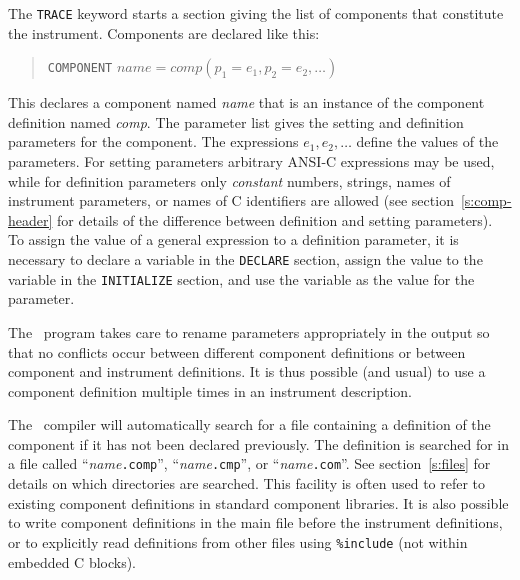 The \texttt{TRACE} keyword starts a section giving the list of
components that constitute the instrument.
Components are declared like this:
\begin{quote}
  \texttt{COMPONENT} $\textit{name} =
    \textit{comp}(p_1 = e_1, p_2 = e_2, \ldots)$
\end{quote}
 
This declares a component named \textit{name} that is an instance of the
component definition named \textit{comp}. The parameter list gives the
setting and definition parameters for the component. The expressions $e_1,
e_2, \ldots$ define the values of the parameters. For setting parameters
arbitrary ANSI-C expressions may be used, while for definition parameters
only \emph{constant} numbers, strings, names of instrument parameters, or names
of C identifiers are allowed (see section~\ref{s:comp-header} for details of
the difference between definition and setting parameters). To assign the
value of a general expression to a definition parameter, it is necessary to
declare a variable in the \texttt{DECLARE} section, assign the value to the
variable in the \texttt{INITIALIZE} section, and use the variable as the
value for the parameter.

The \MCS\ program takes care to rename parameters appropriately in the
output so that no conflicts occur between different component
definitions or between component and instrument definitions. It is thus
possible (and usual) to use a component definition multiple times
in an instrument description.

The \MCS\ compiler will automatically search for a file containing a
definition of the component if it has not been declared previously. The
definition is searched for in a file called ``{\it name\/}{\tt .comp}'',
``{\it name\/}{\tt .cmp}'', or ``{\it name\/}{\tt .com}''. See
section~\ref{s:files} for details on which directories are searched. This
facility is often used to refer to existing component definitions in
standard component libraries. It is also possible to write component
definitions in the main file before the instrument definitions, or to
explicitly read definitions from other files using \verb+%include+
(not within embedded C blocks).

